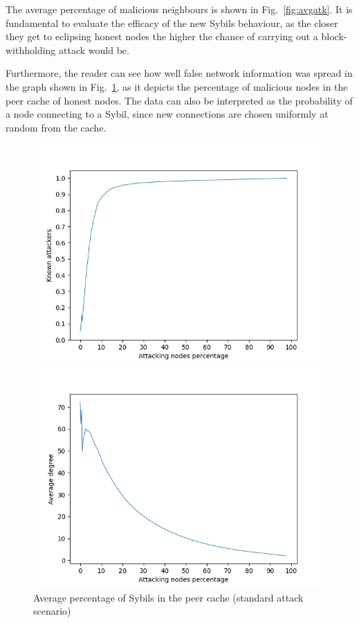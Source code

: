 The average percentage of malicious neighbours is shown in Fig.~\ref{fig:avgatk}. It is fundamental to evaluate the efficacy of the new Sybils behaviour, as the closer they get to eclipsing honest nodes the higher the chance of carrying out a block-withholding attack would be.\par

Furthermore, the reader can see how well false network information was spread in the graph shown in Fig.~\ref{fig:avgatk-known}, as it depicts the percentage of malicious nodes in the peer cache of honest nodes. The data can also be interpreted as the probability of a node connecting to a Sybil, since new connections are chosen uniformly at random from the cache.\par

    \begin{figure}[ht]
        \begin{minipage}[b]{0.5\linewidth}
            \includegraphics[width=1.1\textwidth]{pict/results/in-hon-avg-known-atk.png}
			\centering
			\caption{Average percentage of Sybils in the peer cache (standard attack scenario)}
			\label{fig:avgatk-known}
        \end{minipage}
        \hspace{0.5cm}
        \begin{minipage}[b]{0.5\linewidth}
			\includegraphics[width=1.1\textwidth]{pict/results/in-atk-avg-degree.png}

\end{minipage}
\end{figure}
